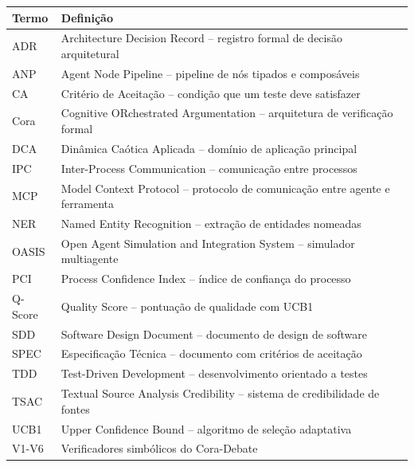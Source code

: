 \documentclass[12pt,a4paper,sumario=tradicional]{abntex2}
\begin{document}
\begin{apendicesenv}
\begin{longtable}{@{}lp{10cm}@{}}
\toprule
\textbf{Termo} & \textbf{Definição} \\
\midrule
ADR & Architecture Decision Record -- registro formal de decisão arquitetural \\
ANP & Agent Node Pipeline -- pipeline de nós tipados e composáveis \\
CA & Critério de Aceitação -- condição que um teste deve satisfazer \\
Cora & Cognitive ORchestrated Argumentation -- arquitetura de verificação formal \\
DCA & Dinâmica Caótica Aplicada -- domínio de aplicação principal \\
IPC & Inter-Process Communication -- comunicação entre processos \\
MCP & Model Context Protocol -- protocolo de comunicação entre agente e ferramenta \\
NER & Named Entity Recognition -- extração de entidades nomeadas \\
OASIS & Open Agent Simulation and Integration System -- simulador multiagente \\
PCI & Process Confidence Index -- índice de confiança do processo \\
Q-Score & Quality Score -- pontuação de qualidade com UCB1 \\
SDD & Software Design Document -- documento de design de software \\
SPEC & Especificação Técnica -- documento com critérios de aceitação \\
TDD & Test-Driven Development -- desenvolvimento orientado a testes \\
TSAC & Textual Source Analysis Credibility -- sistema de credibilidade de fontes \\
UCB1 & Upper Confidence Bound -- algoritmo de seleção adaptativa \\
V1-V6 & Verificadores simbólicos do Cora-Debate \\
\bottomrule
\end{longtable}

\end{apendicesenv}
\end{document}
